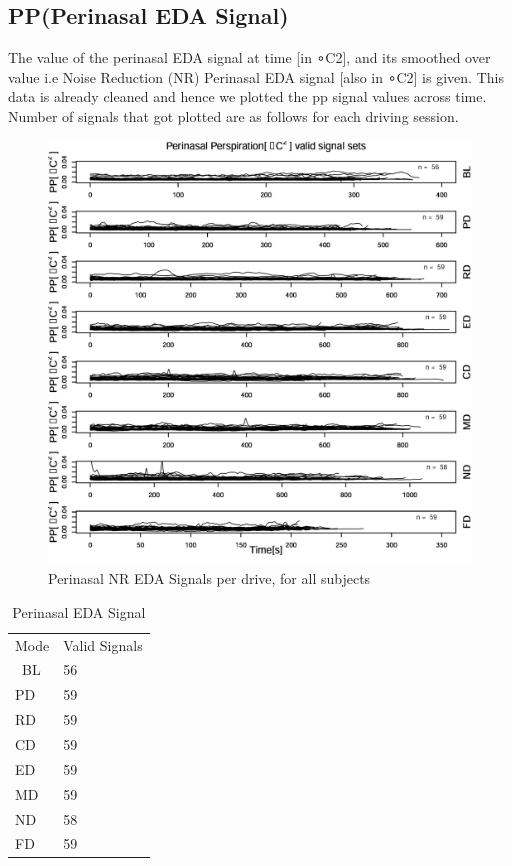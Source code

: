 \documentclass[a4paper]{article}
\begin{document}
\subsection{PP(Perinasal EDA Signal)}

The value of the perinasal EDA signal at time [in ∘C2], and its smoothed over value i.e Noise Reduction (NR) Perinasal EDA signal [also in ∘C2] is given. This data is already cleaned and hence we plotted the pp signal values across time. Number of signals that got plotted are as follows for each driving session.

\begin{figure}[!h]
\centering
\includegraphics[width=1.0\textwidth]{pp.jpg}
\caption{\label{fig:pp}Perinasal NR EDA Signals per drive, for all subjects}
\end{figure}
\FloatBarrier
\begin{table}[!h]
\centering
\begin{tabular}{l|l}
Mode&Valid Signals\\\
BL & 56\\
PD & 59 \\
RD & 59\\
CD & 59\\
ED & 59\\
MD & 59\\
ND & 58\\
FD & 59
\end{tabular}
\caption{\label{tab:pp}Perinasal EDA Signal}
\end{table}
\FloatBarrier
\end{document}
